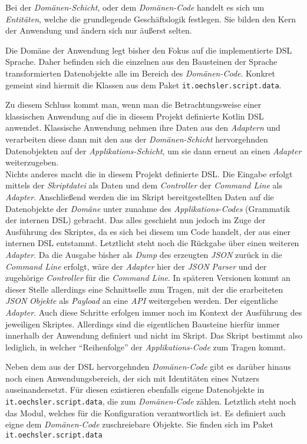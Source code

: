 Bei der \emph{Domänen-Schicht}, oder dem \emph{Domänen-Code} handelt es sich um \emph{Entitäten}, welche die grundlegende Geschäftslogik festlegen.
Sie bilden den Kern der Anwendung und ändern sich nur äußerst selten.

Die Domäne der Anwendung legt bisher den Fokus auf die implementierte DSL Sprache.
Daher befinden sich die einzelnen aus den Bausteinen der Sprache transformierten Datenobjekte alle im Bereich des \emph{Domänen-Code}.
Konkret gemeint sind hiermit die Klassen aus dem Paket \texttt{it.oechsler.script.data}.

Zu diesem Schluss kommt man, wenn man die Betrachtungsweise einer klassischen Anwendung auf die in diesem Projekt definierte Kotlin DSL anwendet.
Klassische Anwendung nehmen ihre Daten aus den \emph{Adaptern} und verarbeiten diese dann mit den aus der \emph{Domänen-Schicht} hervorgehnden Datenobjekten auf der \emph{Applikations-Schicht}, um sie dann erneut an einen \emph{Adapter} weiterzugeben.\\
Nichts anderes macht die in diesem Projekt definierte DSL.
Die Eingabe erfolgt mittels der \emph{Skriptdatei} als Daten und dem \emph{Controller} der \emph{Command Line} als \emph{Adapter}.
Anschließend werden die im Skript bereitgestellten Daten auf die Datenobjekte der \emph{Domäne} unter zunahme des \emph{Applikations-Codes} (Grammatik der internen DSL) gebracht.
Das alles geschieht nun jedoch im Zuge der Ausführung des Skriptes, da es sich bei diesem um Code handelt, der aus einer internen DSL entstammt.
Letztlicht steht noch die Rückgabe über einen weiteren \emph{Adapter}.
Da die Ausgabe bisher als \emph{Dump} des erzeugten \emph{JSON} zurück in die \emph{Command Line} erfolgt, wäre der \emph{Adapter} hier der \emph{JSON} \emph{Parser} und der zugehörige \emph{Controller} für die \emph{Command Line}.
In späteren Versionen kommt an dieser Stelle allerdings eine Schnittselle zum Tragen, mit der die erarbeiteten \emph{JSON} \emph{Objekte} als \emph{Payload} an eine \emph{API} weitergeben werden.
Der eigentliche \emph{Adapter}.
Auch diese Schritte erfolgen immer noch im Kontext der Ausführung des jeweiligen Skriptes.
Allerdings sind die eigentlichen Bausteine hierfür immer innerhalb der Anwendung definiert und nicht im Skript. 
Das Skript bestimmt also lediglich, in welcher \enquote{Reihenfolge} der \emph{Applikations-Code} zum Tragen kommt.

Neben dem aus der DSL hervorgehnden \emph{Domänen-Code} gibt es darüber hinaus noch einen Anwendungsbereich, der sich mit Identitäten eines Nutzers auseinandersetzt.
Für diesen existieren ebenfalls eigene Datenobjekte in \texttt{it.oechsler.script.data}, die zum \emph{Domänen-Code} zählen.
Letztlich steht noch das Modul, welches für die Konfiguration verantwortlich ist.
Es definiert auch eigne dem \emph{Domänen-Code} zuschreiebare Objekte.
Sie finden sich im Paket \texttt{it.oechsler.script.data}


